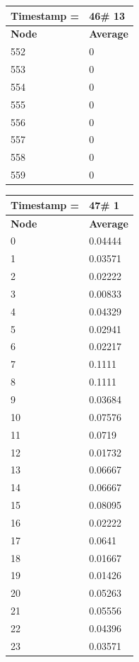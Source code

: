 \begin{tabular}{|l||l|}
\hline
\textbf{Timestamp =} & \textbf{46}\# 13\\\hline
	\textbf{Node} & \textbf{Average} \\ \hline
\hline
	552 & 0 \\ \hline
	553 & 0 \\ \hline
	554 & 0 \\ \hline
	555 & 0 \\ \hline
	556 & 0 \\ \hline
	557 & 0 \\ \hline
	558 & 0 \\ \hline
	559 & 0 \\ \hline
\end{tabular}

\begin{tabular}{|l||l|}
\hline
\textbf{Timestamp =} & \textbf{47}\# 1\\\hline
	\textbf{Node} & \textbf{Average} \\ \hline
\hline
	0 & 0.04444 \\ \hline
	1 & 0.03571 \\ \hline
	2 & 0.02222 \\ \hline
	3 & 0.00833 \\ \hline
	4 & 0.04329 \\ \hline
	5 & 0.02941 \\ \hline
	6 & 0.02217 \\ \hline
	7 & 0.1111 \\ \hline
	8 & 0.1111 \\ \hline
	9 & 0.03684 \\ \hline
	10 & 0.07576 \\ \hline
	11 & 0.0719 \\ \hline
	12 & 0.01732 \\ \hline
	13 & 0.06667 \\ \hline
	14 & 0.06667 \\ \hline
	15 & 0.08095 \\ \hline
	16 & 0.02222 \\ \hline
	17 & 0.0641 \\ \hline
	18 & 0.01667 \\ \hline
	19 & 0.01426 \\ \hline
	20 & 0.05263 \\ \hline
	21 & 0.05556 \\ \hline
	22 & 0.04396 \\ \hline
	23 & 0.03571 \\ \hline

\end{tabular}
